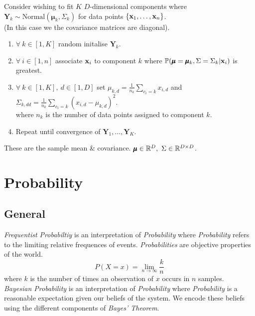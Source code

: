 \documentclass[11pt,a4paper]{article}
\begin{document}
Consider wishing to fit $K$ $D$-dimensional components where $\textbf{Y}_k\sim\text{Normal}(\pmb\mu_k,\Sigma_k)$ for data points $\{\textbf{x}_1,\dots,\textbf{x}_n\}$.\\
(In this case we the covariance matrices are diagonal).
\begin{enumerate}
	\item $\forall\ k\in[1,K]$ random initalise $\textbf{Y}_k$.
	\item $\forall\ i\in[1,n]$ associate $\textbf{x}_i$ to component $k$ where $\mathbb{P}(\pmb\mu=\pmb\mu_k,\Sigma=\Sigma_k|\textbf{x}_i)$ is greatest.
	\item $\forall\ k\in[1,K],\ d\in[1,D]$ set ${\displaystyle\mu_{k,d}=\frac1{n_k}\sum_{c_i=k}x_{i,d}}$ and ${\displaystyle\Sigma_{k,dd}=\frac{1}{n_k}\sum_{c_i=k}(x_{i,d}-\mu_{k,d})^2}$.\\
	where $n_k$ is the number of data points assigned to component $k$.
	\item Repeat until convergence of $\textbf{Y}_1,\dots,\textbf{Y}_K$.
\end{enumerate}
\nb These are the sample mean \& covariance. $\pmb\mu\in\mathbb{R}^{D},\ \Sigma\in\mathbb{R}^{D\times D}$.

\section{Probability}

\subsection{General}

\textit{Frequentist Probabiltiy} is an interpretation of \textit{Probability} where \textit{Probability} refers to the limiting relative frequences of events. \textit{Probabilities} are objective properties of the world.
$$P(X=x)=\lim_{n\to\infty}\dfrac{k}{n}$$
where $k$ is the number of times an observation of $x$ occurs in $n$ samples.\\

\textit{Bayesian Probability} is an interpretation of \textit{Probability} where \textit{Probability} is a reasonable expectation given our beliefs of the system. We encode these beliefs using the different components of \textit{Bayes' Theorem}.\\

\end{document}
